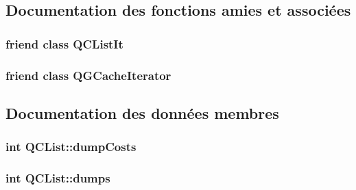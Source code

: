 \subsection{Documentation des fonctions amies et associées}
\hypertarget{class_q_c_list_a3e8195ca5690dd80612249a0ccb62f8f}{}
\subsubsection[{Q\+C\+List\+It}]{\setlength{\rightskip}{0pt plus 5cm}friend class {\bf Q\+C\+List\+It}\hspace{0.3cm}{\ttfamily [friend]}}\label{class_q_c_list_a3e8195ca5690dd80612249a0ccb62f8f}
\hypertarget{class_q_c_list_a37933afdeb94bef86bf66aca84fc229c}{}
\subsubsection[{Q\+G\+Cache\+Iterator}]{\setlength{\rightskip}{0pt plus 5cm}friend class {\bf Q\+G\+Cache\+Iterator}\hspace{0.3cm}{\ttfamily [friend]}}\label{class_q_c_list_a37933afdeb94bef86bf66aca84fc229c}


\subsection{Documentation des données membres}
\hypertarget{class_q_c_list_a7e76a9fcd2fbb6ebb4ca3d1d1dc392e8}{}
\subsubsection[{dump\+Costs}]{\setlength{\rightskip}{0pt plus 5cm}int Q\+C\+List\+::dump\+Costs}\label{class_q_c_list_a7e76a9fcd2fbb6ebb4ca3d1d1dc392e8}
\hypertarget{class_q_c_list_ad767b5c4aecdf9f35b5bc07d67303e36}{}
\subsubsection[{dumps}]{\setlength{\rightskip}{0pt plus 5cm}int Q\+C\+List\+::dumps}\label{class_q_c_list_ad767b5c4aecdf9f35b5bc07d67303e36}
\hypertarget{class_q_c_list_a5a2694263c88683048754d331940fd98}{}
